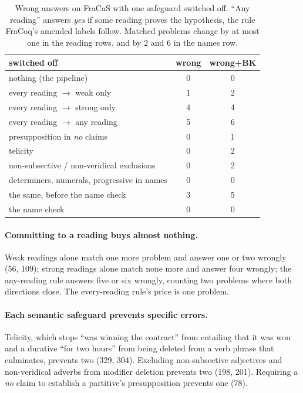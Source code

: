 \documentclass[11pt]{article}
\newcommand{\yes}{\textit{yes}}
\newcommand{\no}{\textit{no}}
\begin{document}
\begin{table}[t]
\centering\small
\setlength{\tabcolsep}{3pt}
\begin{tabular}{p{3.6cm}cc}
\toprule
switched off & wrong & wrong+BK \\
\midrule
nothing (the pipeline) & 0 & 0 \\
every reading $\to$ weak only & 1 & 2 \\
every reading $\to$ strong only & 4 & 4 \\
every reading $\to$ any reading & 5 & 6 \\
presupposition in \no{} claims & 0 & 1 \\
telicity & 0 & 2 \\
non-subsective / non-veridical exclusions & 0 & 2 \\
determiners, numerals, progressive in names & 0 & 0 \\
\quad the same, before the name check & 3 & 5 \\
the name check & 0 & 0 \\
\bottomrule
\end{tabular}
\caption{Wrong answers on FraCaS with one safeguard switched off.
``Any reading'' answers \yes{} if some reading proves the hypothesis,
the rule FraCoq's amended labels follow. Matched problems change by at most
one in the reading rows, and by 2 and 6 in the names row.}
\label{tab:ablations}
\end{table}

\paragraph{Committing to a reading buys almost nothing.} Weak readings
alone match one more problem and answer one or two wrongly (56, 109);
strong readings alone match none more and answer four wrongly; the
any-reading rule answers five or six wrongly, counting two problems
where both directions close. The every-reading rule's price is one
problem.

\paragraph{Each semantic safeguard prevents specific errors.} Telicity,
which stops ``was winning the contract'' from entailing that it was won
\citep{dowty-1979-word} and a durative ``for two hours'' from being
deleted from a verb phrase that culminates, prevents two (329, 304).
Excluding non-subsective adjectives and non-veridical adverbs from
modifier deletion prevents two (198, 201). Requiring a \no{} claim to
establish a partitive's presupposition \citep{strawson-1950-referring}
prevents one (78).
\end{document}
